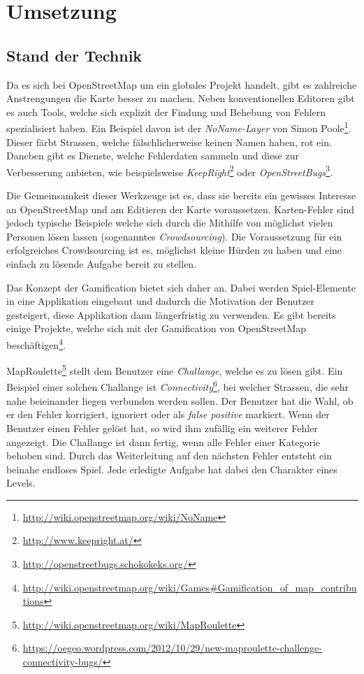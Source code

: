 \chapter{Umsetzung}
\label{umsetzung}

\section{Stand der Technik}
Da es sich bei \gls{OpenStreetMap} um ein globales Projekt handelt, gibt es zahlreiche Anstrengungen die Karte besser zu machen.
Neben konventionellen Editoren gibt es auch Tools, welche sich explizit der Findung und Behebung von Fehlern spezialisiert haben.
Ein Beispiel davon ist der \emph{NoName-Layer} von Simon Poole\footnote{\url{http://wiki.openstreetmap.org/wiki/NoName}}. Dieser färbt Strassen, welche fälschlicherweise keinen Namen haben, rot ein.
Daneben gibt es Dienste, welche Fehlerdaten sammeln und diese zur Verbesserung anbieten, wie beispielsweise \emph{KeepRight}\footnote{\url{http://www.keepright.at/}} oder \emph{OpenStreetBugs}\footnote{\url{http://openstreetbugs.schokokeks.org/}}.

Die Gemeinsamkeit dieser Werkzeuge ist es, dass sie bereits ein gewisses Interesse an \gls{OpenStreetMap} und am Editieren der Karte voraussetzen.
Karten-Fehler sind jedoch typische Beispiele welche sich durch die Mithilfe von möglichst vielen Personen lösen lassen (sogenanntes \emph{Crowdsourcing}).
Die Voraussetzung für ein erfolgreiches Crowdsourcing ist es, möglichst kleine Hürden zu haben und eine einfach zu lösende Aufgabe bereit zu stellen.

Das Konzept der Gamification bietet sich daher an.
Dabei werden Spiel-Elemente in eine Applikation eingebaut und dadurch die Motivation der Benutzer gesteigert, diese Applikation dann längerfristig zu verwenden.
Es gibt bereits einige Projekte, welche sich mit der Gamification von OpenStreetMap beschäftigen\footnote{\url{http://wiki.openstreetmap.org/wiki/Games\#Gamification_of_map_contributions}}.

MapRoulette\footnote{\url{http://wiki.openstreetmap.org/wiki/MapRoulette}} stellt dem Benutzer eine \emph{Challange}, welche es zu lösen gibt.
Ein Beispiel einer solchen Challange ist \emph{Connectivity}\footnote{\url{https://oegeo.wordpress.com/2012/10/29/new-maproulette-challenge-connectivity-bugs/}}, bei welcher Strassen, die sehr nahe beieinander liegen verbunden werden sollen.
Der Benutzer hat die Wahl, ob er den Fehler korrigiert, ignoriert oder als \emph{false positive} markiert.
Wenn der Benutzer einen Fehler gelöst hat, so wird ihm zufällig ein weiterer Fehler angezeigt.
Die Challange ist dann fertig, wenn alle Fehler einer Kategorie behoben sind.
Durch das Weiterleitung auf den nächsten Fehler entsteht ein beinahe endloses Spiel. Jede erledigte Aufgabe hat dabei den Charakter eines Levels.

